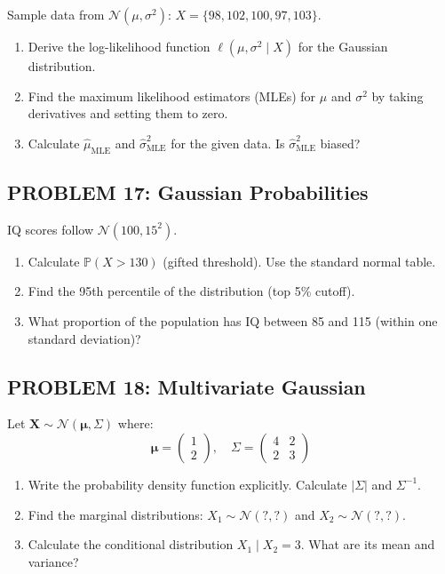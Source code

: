 \documentclass[12pt]{article}
\begin{document}
Sample data from \(\mathcal{N}(\mu, \sigma^2)\): \(X = \{98, 102, 100, 97, 103\}\).

\begin{enumerate}
\item[(a)] Derive the log-likelihood function \(\ell(\mu, \sigma^2 \mid X)\) for the Gaussian distribution.
\item[(b)] Find the maximum likelihood estimators (MLEs) for \(\mu\) and \(\sigma^2\) by taking derivatives and setting them to zero.
\item[(c)] Calculate \(\hat{\mu}_{\text{MLE}}\) and \(\hat{\sigma}^2_{\text{MLE}}\) for the given data. Is \(\hat{\sigma}^2_{\text{MLE}}\) biased?
\end{enumerate}

\subsection*{PROBLEM 17: Gaussian Probabilities}

IQ scores follow \(\mathcal{N}(100, 15^2)\).

\begin{enumerate}
\item[(a)] Calculate \(\mathbb{P}(X > 130)\) (gifted threshold). Use the standard normal table.
\item[(b)] Find the 95th percentile of the distribution (top 5\% cutoff).
\item[(c)] What proportion of the population has IQ between 85 and 115 (within one standard deviation)?
\end{enumerate}

\subsection*{PROBLEM 18: Multivariate Gaussian}

Let \(\mathbf{X} \sim \mathcal{N}(\boldsymbol{\mu}, \Sigma)\) where:
\[
\boldsymbol{\mu} = \begin{pmatrix} 1 \\ 2 \end{pmatrix}, \quad
\Sigma = \begin{pmatrix} 4 & 2 \\ 2 & 3 \end{pmatrix}
\]

\begin{enumerate}
\item[(a)] Write the probability density function explicitly. Calculate \(|\Sigma|\) and \(\Sigma^{-1}\).
\item[(b)] Find the marginal distributions: \(X_1 \sim \mathcal{N}(?, ?)\) and \(X_2 \sim \mathcal{N}(?, ?)\).
\item[(c)] Calculate the conditional distribution \(X_1 \mid X_2 = 3\). What are its mean and variance?
\end{enumerate}
\end{document}
